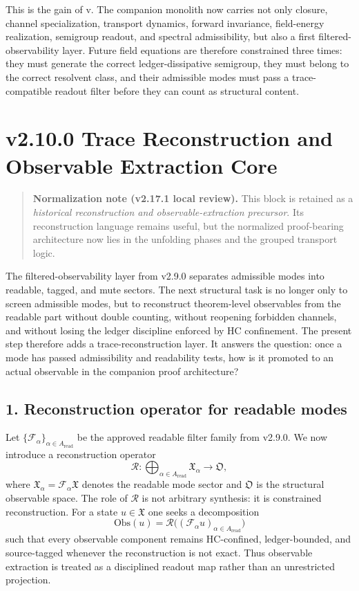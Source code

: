 This is the gain of v\docversion. The companion monolith now carries not only
closure, channel specialization, transport dynamics, forward invariance,
field-energy realization, semigroup readout, and spectral admissibility, but also a
first filtered-observability layer. Future field equations are therefore constrained
three times: they must generate the correct ledger-dissipative semigroup, they must
belong to the correct resolvent class, and their admissible modes must pass a
trace-compatible readout filter before they can count as structural content.


\section*{v2.10.0 Trace Reconstruction and Observable Extraction Core}

\begin{quote}
\textbf{Normalization note (v2.17.1 local review).}
This block is retained as a \emph{historical reconstruction and observable-extraction precursor}. Its reconstruction language remains useful, but the normalized proof-bearing architecture now lies in the unfolding phases and the grouped transport logic.
\end{quote}

The filtered-observability layer from v2.9.0 separates admissible modes into
readable, tagged, and mute sectors. The next structural task is no longer only to
screen admissible modes, but to reconstruct theorem-level observables from the
readable part without double counting, without reopening forbidden channels, and
without losing the ledger discipline enforced by HC confinement. The present step
therefore adds a trace-reconstruction layer. It answers the question: once a mode
has passed admissibility and readability tests, how is it promoted to an actual
observable in the companion proof architecture?

\subsection*{1. Reconstruction operator for readable modes}
Let $\{\mathcal F_\alpha\}_{\alpha\in A_{\mathrm{read}}}$ be the approved readable
filter family from v2.9.0. We now introduce a reconstruction operator
\[
\mathcal R: \bigoplus_{\alpha\in A_{\mathrm{read}}} \mathfrak X_\alpha \to \mathfrak O,
\]
where $\mathfrak X_\alpha = \mathcal F_\alpha \mathfrak X$ denotes the readable mode
sector and $\mathfrak O$ is the structural observable space. The role of
$\mathcal R$ is not arbitrary synthesis: it is constrained reconstruction. For a
state $u\in\mathfrak X$ one seeks a decomposition
\[
\mathrm{Obs}(u) = \mathcal R\bigl((\mathcal F_\alpha u)_{\alpha\in A_{\mathrm{read}}}\bigr)
\]
such that every observable component remains HC-confined, ledger-bounded, and
source-tagged whenever the reconstruction is not exact. Thus observable extraction
is treated as a disciplined readout map rather than an unrestricted projection.

